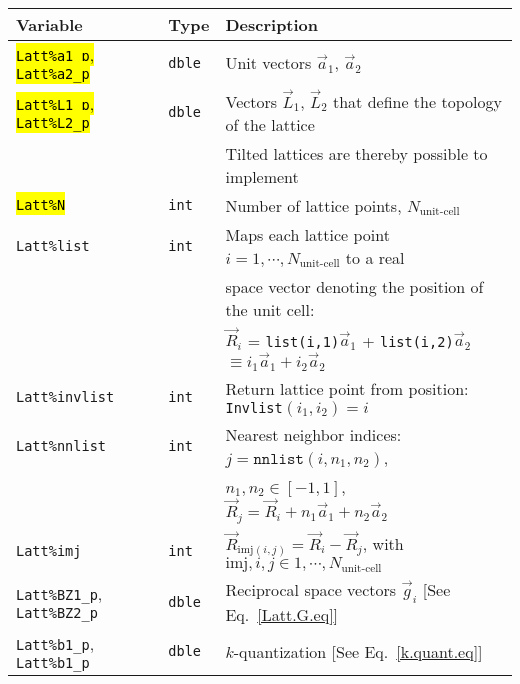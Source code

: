 %
\begin{table}[h!]
	\begin{center}
   \begin{tabular}{@{} l l @{$\;\;$} l @{}}\toprule
    Variable  & Type & Description \\\midrule
     \hl{\texttt{Latt\%a1\_p}, \texttt{Latt\%a2\_p}}   & \texttt{dble}  & Unit vectors $\vec{a}_1$,  $\vec{a}_2$ \\ 
     \hl{\texttt{Latt\%L1\_p}, \texttt{Latt\%L2\_p}}   & \texttt{dble}  & Vectors $\vec{L}_1$, $\vec{L}_2$ that define the topology of the  lattice \\
     									               &                &  Tilted lattices are  thereby possible to implement \\
    \hl{\texttt{Latt\%N}}                              & \texttt{int}   &  Number of lattice points, $N_{\text{unit-cell}}$ \\
    \texttt{Latt\%list}                                & \texttt{int}   &  Maps each lattice point $i=1,\cdots, N_{\text{unit-cell}}$ to a real\\
                                                                    &   &  space vector denoting the position of the unit cell: \\
                                                                    &   & $\vec{R}_i$ = \texttt{list(i,1)}$\vec{a}_1$ + \texttt{list(i,2)}$\vec{a}_2$  $  \equiv i_1  \vec{a}_1 + i_2  \vec{a}_2 $ \\
    \texttt{Latt\%invlist}                             & \texttt{int}   &  Return lattice point from position: \texttt{Invlist}$(i_1,i_2) = i $ \\
    \texttt{Latt\%nnlist}                              & \texttt{int}   &  Nearest neighbor indices: $j = \texttt{nnlist} (i, n_1, n_2) $, \\
                                                       &                &  $n_1, n_2 \in [-1,1] $, $\vec{R}_j = \vec{R}_i + n_1 \vec{a}_1  + n_2 \vec{a}_2 $ \\
   \texttt{Latt\%imj}                                  & \texttt{int}   &  $\vec{R}_{\mathrm{imj}(i,j)}  =  \vec{R}_i -  \vec{R}_j$, with  $\mathrm{imj}, i, j \in  1,\cdots, N_{\text{unit-cell}}$ \\
    \texttt{Latt\%BZ1\_p}, \texttt{Latt\%BZ2\_p}       & \texttt{dble}  & Reciprocal space vectors $\vec{g}_i$   [See Eq.~\eqref{Latt.G.eq}] \\
    \texttt{Latt\%b1\_p}, \texttt{Latt\%b1\_p}         & \texttt{dble}  &  $k$-quantization [See Eq.~\eqref{k.quant.eq}] \\

\end{tabular}
\end{center}
\end{table}
